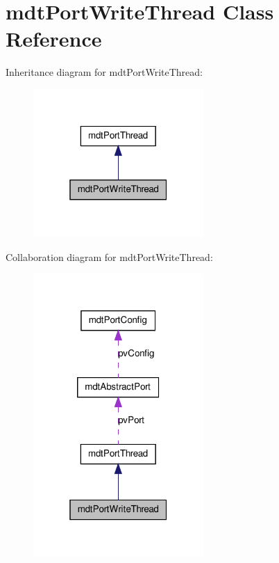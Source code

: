 \hypertarget{classmdt_port_write_thread}{
\section{mdtPortWriteThread Class Reference}
\label{classmdt_port_write_thread}
}


Inheritance diagram for mdtPortWriteThread:\nopagebreak
\begin{figure}[H]
\begin{center}
\leavevmode
\includegraphics[width=184pt]{classmdt_port_write_thread__inherit__graph}
\end{center}
\end{figure}


Collaboration diagram for mdtPortWriteThread:\nopagebreak
\begin{figure}[H]
\begin{center}
\leavevmode
\includegraphics[width=184pt]{classmdt_port_write_thread__coll__graph}
\end{center}
\end{figure}
